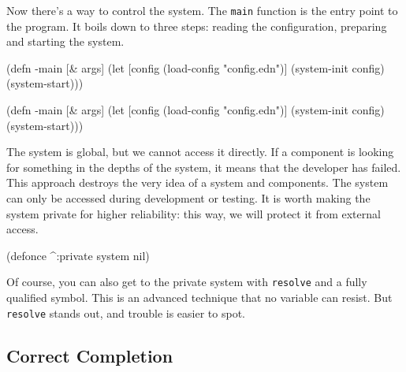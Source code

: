 \fi


Now there's a way to control the system. The \verb|main| function is the entry point to the program. It boils down to three steps: reading the configuration, preparing and starting the system.

\ifnarrow

\begin{english}
  \begin{clojure}
(defn -main [& args]
  (let [config
        (load-config "config.edn")]
    (system-init config)
    (system-start)))
  \end{clojure}
\end{english}

\else

\begin{english}
  \begin{clojure}
(defn -main [& args]
  (let [config (load-config "config.edn")]
    (system-init config)
    (system-start)))
  \end{clojure}
\end{english}

\fi

The system is global, but we cannot access it directly. If a component is looking for something in the depths of the system, it means that the developer has failed. This approach destroys the very idea of a system and components. The system can only be accessed during development or testing. It is worth making the system private for higher reliability: this way, we will protect it from external access.


\begin{english}
  \begin{clojure}
(defonce ^:private system nil)
  \end{clojure}
\end{english}

Of course, you can also get to the private system with \verb|resolve| and a fully qualified symbol. This is an advanced technique that no variable can resist. But \verb|resolve| stands out, and trouble is easier to spot.

\subsection{Correct Completion}

